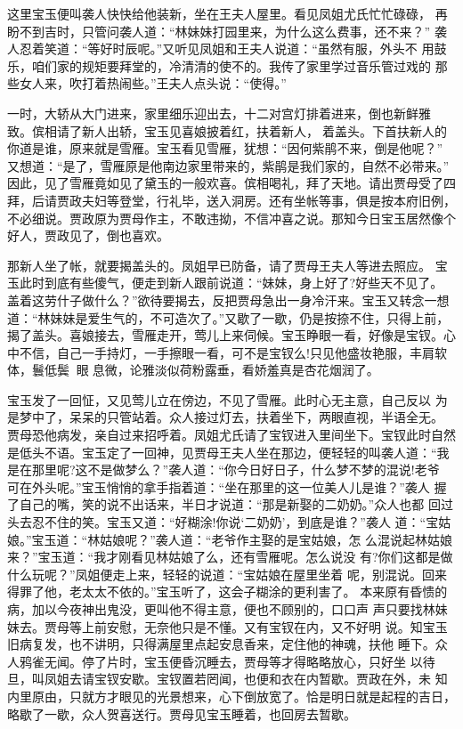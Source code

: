 这里宝玉便叫袭人快快给他装新，坐在王夫人屋里。看见凤姐尤氏忙忙碌碌，
再盼不到吉时，只管问袭人道：“林妹妹打园里来，为什么这么费事，还不来？”
袭人忍着笑道：“等好时辰呢。”又听见凤姐和王夫人说道：“虽然有服，外头不
用鼓乐，咱们家的规矩要拜堂的，冷清清的使不的。我传了家里学过音乐管过戏的
那些女人来，吹打着热闹些。”王夫人点头说：“使得。”

一时，大轿从大门进来，家里细乐迎出去，十二对宫灯排着进来，倒也新鲜雅
致。傧相请了新人出轿，宝玉见喜娘披着红，扶着新人，着盖头。下首扶新人的
你道是谁，原来就是雪雁。宝玉看见雪雁，犹想：“因何紫鹃不来，倒是他呢？”
又想道：“是了，雪雁原是他南边家里带来的，紫鹃是我们家的，自然不必带来。”
因此，见了雪雁竟如见了黛玉的一般欢喜。傧相喝礼，拜了天地。请出贾母受了四
拜，后请贾政夫妇等登堂，行礼毕，送入洞房。还有坐帐等事，俱是按本府旧例，
不必细说。贾政原为贾母作主，不敢违拗，不信冲喜之说。那知今日宝玉居然像个
好人，贾政见了，倒也喜欢。

那新人坐了帐，就要揭盖头的。凤姐早已防备，请了贾母王夫人等进去照应。
宝玉此时到底有些傻气，便走到新人跟前说道：“妹妹，身上好了?好些天不见了。
盖着这劳什子做什么？”欲待要揭去，反把贾母急出一身冷汗来。宝玉又转念一想
道：“林妹妹是爱生气的，不可造次了。”又歇了一歇，仍是按捺不住，只得上前，
揭了盖头。喜娘接去，雪雁走开，莺儿上来伺候。宝玉睁眼一看，好像是宝钗。心
中不信，自己一手持灯，一手擦眼一看，可不是宝钗么!只见他盛妆艳服，丰肩软
体，鬟低鬓，眼息微，论雅淡似荷粉露垂，看娇羞真是杏花烟润了。

宝玉发了一回怔，又见莺儿立在傍边，不见了雪雁。此时心无主意，自己反以
为是梦中了，呆呆的只管站着。众人接过灯去，扶着坐下，两眼直视，半语全无。
贾母恐他病发，亲自过来招呼着。凤姐尤氏请了宝钗进入里间坐下。宝钗此时自然
是低头不语。宝玉定了一回神，见贾母王夫人坐在那边，便轻轻的叫袭人道：“我
是在那里呢?这不是做梦么？”袭人道：“你今日好日子，什么梦不梦的混说!老爷
可在外头呢。”宝玉悄悄的拿手指着道：“坐在那里的这一位美人儿是谁？”袭人
握了自己的嘴，笑的说不出话来，半日才说道：“那是新娶的二奶奶。”众人也都
回过头去忍不住的笑。宝玉又道：“好糊涂!你说‘二奶奶’，到底是谁？”袭人
道：“宝姑娘。”宝玉道：“林姑娘呢？”袭人道：“老爷作主娶的是宝姑娘，怎
么混说起林姑娘来？”宝玉道：“我才刚看见林姑娘了么，还有雪雁呢。怎么说没
有?你们这都是做什么玩呢？”凤姐便走上来，轻轻的说道：“宝姑娘在屋里坐着
呢，别混说。回来得罪了他，老太太不依的。”宝玉听了，这会子糊涂的更利害了。
本来原有昏愦的病，加以今夜神出鬼没，更叫他不得主意，便也不顾别的，口口声
声只要找林妹妹去。贾母等上前安慰，无奈他只是不懂。又有宝钗在内，又不好明
说。知宝玉旧病复发，也不讲明，只得满屋里点起安息香来，定住他的神魂，扶他
睡下。众人鸦雀无闻。停了片时，宝玉便昏沉睡去，贾母等才得略略放心，只好坐
以待旦，叫凤姐去请宝钗安歇。宝钗置若罔闻，也便和衣在内暂歇。贾政在外，未
知内里原由，只就方才眼见的光景想来，心下倒放宽了。恰是明日就是起程的吉日，
略歇了一歇，众人贺喜送行。贾母见宝玉睡着，也回房去暂歇。

